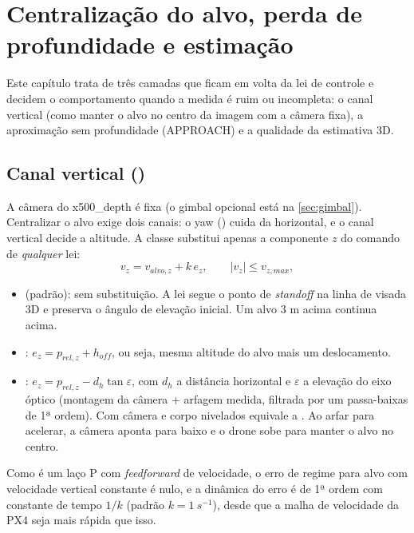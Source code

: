 \chapter{Centralização do alvo, perda de profundidade e estimação}
\label{cap:centralizacao}

Este capítulo trata de três camadas que ficam em volta da lei de controle e decidem o
comportamento quando a medida é ruim ou incompleta: o canal vertical (como manter o alvo
no centro da imagem com a câmera fixa), a aproximação sem profundidade (APPROACH) e a
qualidade da estimativa 3D.

\section{Canal vertical ()}
A câmera do x500\_depth é fixa (o gimbal opcional está na \autoref{sec:gimbal}). Centralizar o alvo exige dois canais: o yaw
() cuida da horizontal, e o canal vertical decide a altitude.
A classe  substitui apenas a componente $z$ do comando de
\emph{qualquer} lei:
\begin{equation}
  v_z = v_{alvo,z} + k\,e_z,\qquad |v_z|\le v_{z,max},
\end{equation}
\begin{itemize}
  \item {} (padrão): sem substituição. A lei segue o ponto de \emph{standoff} na
        linha de visada 3D e preserva o ângulo de elevação inicial. Um alvo 3 m acima
        continua acima.
  \item {}: $e_z=p_{rel,z}+h_{off}$, ou seja, mesma altitude do alvo
        mais um deslocamento.
  \item {}: $e_z=p_{rel,z}-d_h\tan\varepsilon$, com $d_h$ a distância
        horizontal e $\varepsilon$ a elevação do eixo óptico (montagem da câmera + arfagem medida,
        filtrada por um passa-baixas de 1ª ordem). Com câmera e corpo nivelados equivale a
        . Ao arfar para acelerar, a câmera aponta para baixo e o drone
        sobe para manter o alvo no centro.
\end{itemize}
Como é um laço P com \emph{feedforward} de velocidade, o erro de regime para alvo com
velocidade vertical constante é nulo, e a dinâmica do erro é de 1ª ordem com constante de
tempo $1/k$ (padrão $k=\SI{1}{s^{-1}}$), desde que a malha de velocidade da PX4 seja mais
rápida que isso.

